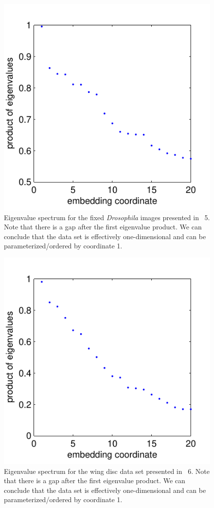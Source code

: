 \begin{figure}
\includegraphics{figS5}
\caption[Eigenvalue spectrum for the fixed {\em Drosophila} images]{Eigenvalue spectrum for the fixed {\em Drosophila} images presented in \fig~5. Note that there is a gap after the first eigenvalue product. We can conclude that the data set is effectively one-dimensional and can be parameterized/ordered by coordinate 1.}
\end{figure}

\begin{figure}
\includegraphics{figS6}
\caption[Eigenvalue spectrum for the wing disc data set]{Eigenvalue spectrum for the wing disc data set presented in \fig~6. Note that there is a gap after the first eigenvalue product. We can conclude that the data set is effectively one-dimensional and can be parameterized/ordered by coordinate 1.}
\label{fig:eigenvalues_wing_disc}
\end{figure}